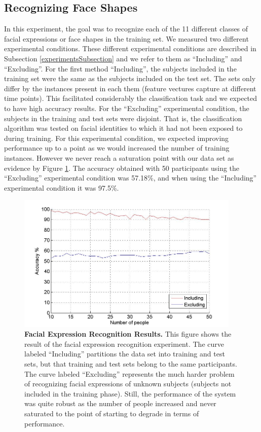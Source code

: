 \documentclass[]{article}
\begin{document}
\subsection{Recognizing Face Shapes}
In this experiment, the goal was to recognize each of the 11 different classes of facial expressions or face shapes in
the training set. We measured two different experimental conditions. These different experimental conditions are
described in Subsection \ref{experimentsSubsection} and we refer to them as ``Including'' and ``Excluding''. For the
first method ``Including'', the subjects included in the training set were the same as the subjects included on the test
set. The sets only differ by the instances present in each them (feature vectures capture at different time points).
This facilitated considerably the classification task and we expected to have high accuracy results. For the
``Excluding'' experimental condition, the subjects in the training and test sets were disjoint. That is, the
classification algorithm was tested on facial identities to which it had not been exposed to during training. For this
experimental condition, we expected improving performance up to a point as we would increased the number of training
instances. However we never reach a saturation point with our data set as evidence by Figure \ref{feRecognition}. The
accuracy obtained with 50 participants using the ``Excluding'' experimental condition was 57.18\%, and when using the
``Including'' experimental condition it was 97.5\%.
 

\begin{figure}[ht]
\begin{center}
\vspace{-3mm}
\includegraphics[width=0.95\textwidth]{figures/figureRecognizeFacialExpressionTrue.jpg}
\end{center}
\caption{\textbf{Facial Expression Recognition Results.} This figure shows the result of the facial expression
recognition experiment. The curve labeled ``Including'' partitions the data set into training and test sets, but that
training and test sets belong to the same participants. The curve labeled ``Excluding'' represents the much harder
problem of recognizing facial expressions of unknown subjects (subjects not included in the training phase). Still, the performance 
of the system was quite robust as the number of people increased and never saturated to the point of starting to
degrade in terms of performance.}
\label{feRecognition}
\end{figure}
\end{document}
